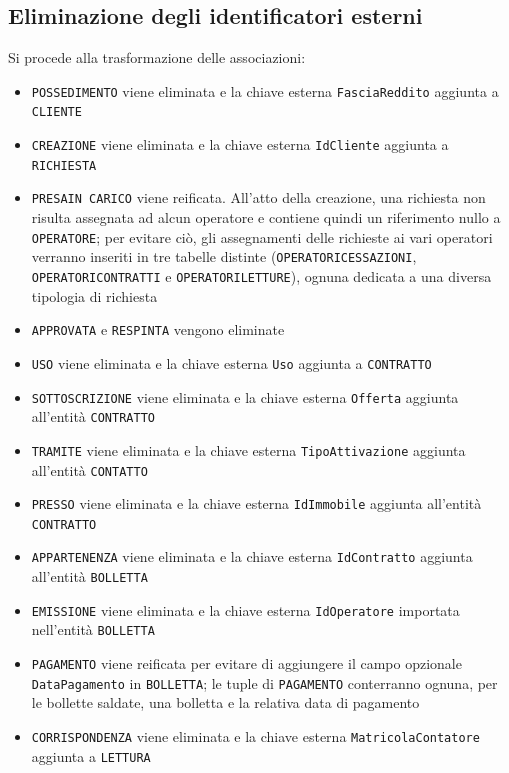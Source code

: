 \documentclass[a4paper,12pt]{report}
\begin{document}
\subsection{Eliminazione degli identificatori esterni}
Si procede alla trasformazione delle associazioni:
\begin{itemize}
    \item \texttt{POSSEDIMENTO} viene eliminata e la chiave esterna \texttt{FasciaReddito} aggiunta a \texttt{CLIENTE}
    \item \texttt{CREAZIONE} viene eliminata e la chiave esterna \texttt{IdCliente} aggiunta a \texttt{RICHIESTA}
    \item \texttt{PRESA\textunderscore IN \textunderscore CARICO} viene reificata. All'atto della creazione, una richiesta non risulta assegnata ad alcun operatore e contiene quindi un riferimento nullo a \texttt{OPERATORE}; per evitare ciò, gli assegnamenti delle richieste ai vari operatori verranno inseriti in tre tabelle distinte (\texttt{OPERATORI\textunderscore CESSAZIONI}, \texttt{OPERATORI\textunderscore CONTRATTI} e \texttt{OPERATORI\textunderscore LETTURE}), ognuna dedicata a una diversa tipologia di richiesta
    \item \texttt{APPROVATA} e \texttt{RESPINTA} vengono eliminate
    \item \texttt{USO} viene eliminata e la chiave esterna \texttt{Uso} aggiunta a \texttt{CONTRATTO}
    \item \texttt{SOTTOSCRIZIONE} viene eliminata e la chiave esterna \texttt{Offerta} aggiunta all'entità \texttt{CONTRATTO}
    \item \texttt{TRAMITE} viene eliminata e la chiave esterna \texttt{TipoAttivazione} aggiunta all'entità \texttt{CONTATTO}
    \item \texttt{PRESSO} viene eliminata e la chiave esterna \texttt{IdImmobile} aggiunta all'entità \texttt{CONTRATTO}
    \item \texttt{APPARTENENZA} viene eliminata e la chiave esterna \texttt{IdContratto} aggiunta all'entità \texttt{BOLLETTA}
    \item \texttt{EMISSIONE} viene eliminata e la chiave esterna \texttt{IdOperatore} importata nell'entità \texttt{BOLLETTA}
    \item \texttt{PAGAMENTO} viene reificata per evitare di aggiungere il campo opzionale \texttt{DataPagamento} in \texttt{BOLLETTA}; le tuple di \texttt{PAGAMENTO} conterranno ognuna, per le bollette saldate, una bolletta e la relativa data di pagamento
    \item \texttt{CORRISPONDENZA} viene eliminata e la chiave esterna \texttt{MatricolaContatore} aggiunta a \texttt{LETTURA}

\end{itemize}
\end{document}
